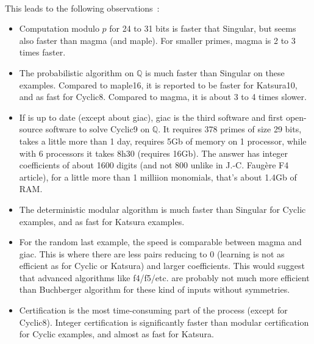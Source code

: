 \documentclass[a4paper,11pt]{book}
\begin{document}
\begin{giacjshere}
\begin{tabular}{|c|c|c|c||c|c|c|}
\hline 
\end{tabular}\\
This leads to the following observations~:
\begin{itemize}
\item Computation modulo $p$ for 24 to 31 bits is faster that Singular, but seems also
  faster than magma (and maple). For smaller primes, magma is 2 to 3
  times faster.
\item The probabilistic algorithm on $\mathbb{Q}$ is much faster than Singular on these examples.
Compared to maple16, it is reported to be faster for Katsura10, 
and as fast for Cyclic8. Compared to magma, it is about 3 to 4
times slower. 
\item If \cite{magma} is up to date (except about giac), giac is the third software and first
  open-source software to solve Cyclic9 on $\mathbb{Q}$. It requires 378
  primes of size 29 bits, takes a little more than 1 day, requires 5Gb
  of memory on 1 processor, while with 6 processors it takes
8h30 (requires 16Gb). The answer has integer coefficients of about 1600 digits
(and not 800 unlike in J.-C. Faug\`ere F4 article), for a little
more than 1 milliion monomials, that's about 1.4Gb of RAM.
\item The deterministic modular algorithm is much faster than Singular for Cyclic examples,
and as fast for Katsura examples. 
\item For the random last example, the speed is comparable between
  magma and giac. This is where there are less pairs reducing to
  0 (learning is not as efficient as for Cyclic or Katsura) and larger
  coefficients. This would suggest that advanced algorithms 
like f4/f5/etc. are probably
not much more efficient than Buchberger algorithm for these kind
of inputs without symmetries.
\item Certification is the most time-consuming part of the process (except
for Cyclic8). Integer certification is significantly faster than modular certification
for Cyclic examples, and almost as fast for Katsura.
\end{itemize}


\end{giacjshere}
\end{document}
